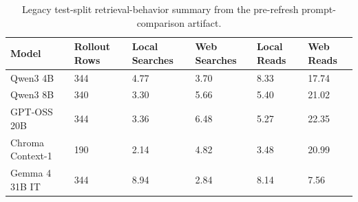 \begin{table}[t]
\small
\centering
\begin{tabular}{llllll}
\toprule
\textbf{Model} & \textbf{Rollout Rows} & \textbf{Local Searches} & \textbf{Web Searches} & \textbf{Local Reads} & \textbf{Web Reads} \\
\midrule
Qwen3 4B & 344 & 4.77 & 3.70 & 8.33 & 17.74 \\
Qwen3 8B & 340 & 3.30 & 5.66 & 5.40 & 21.02 \\
GPT-OSS 20B & 344 & 3.36 & 6.48 & 5.27 & 22.35 \\
Chroma Context-1 & 190 & 2.14 & 4.82 & 3.48 & 20.99 \\
Gemma 4 31B IT & 344 & 8.94 & 2.84 & 8.14 & 7.56 \\
\bottomrule
\end{tabular}
\caption{Legacy test-split retrieval-behavior summary from the pre-refresh prompt-comparison artifact.}
\label{tab:legacy_retrieval_behavior_test}
\end{table}
